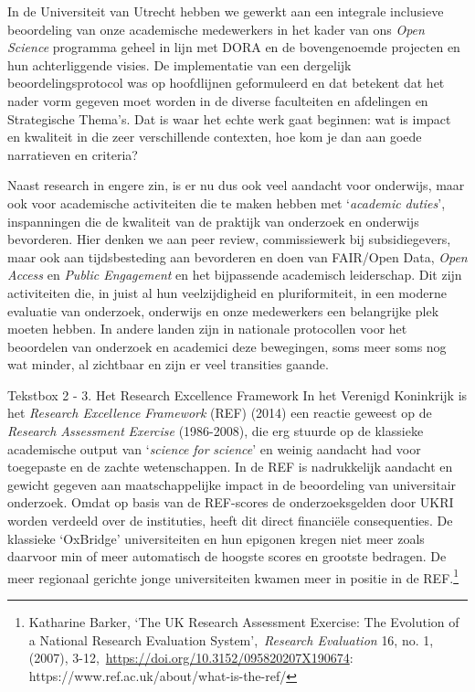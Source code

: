 \documentclass[smallauthor, chapterhaspagenum, nochapterinheader, pagenuminheader,  bigchapnum,medium2, tocpages,  garamond, titleinheader]{jote-book}
\begin{document}
	In de Universiteit van Utrecht hebben we gewerkt aan een integrale inclusieve beoordeling van onze academische medewerkers in het kader van ons \emph{Open }\emph{Science} programma geheel in lijn met DORA en de bovengenoemde projecten en hun achterliggende visies. De implementatie van een dergelijk beoordelingsprotocol was op hoofdlijnen geformuleerd en dat betekent dat het nader vorm gegeven moet worden in de diverse faculteiten en afdelingen en Strategische Thema's. Dat is waar het echte werk gaat beginnen: wat is impact en kwaliteit in die zeer verschillende contexten, hoe kom je dan aan goede narratieven en criteria?











	Naast research in engere zin, is er nu dus ook veel aandacht voor onderwijs, maar ook voor academische activiteiten die te maken hebben met ‘\emph{academic}\emph{ }\emph{duties}', inspanningen die de kwaliteit van de praktijk van onderzoek en onderwijs bevorderen. Hier denken we aan peer review, commissiewerk bij subsidiegevers, maar ook aan tijdsbesteding aan bevorderen en doen van FAIR/Open Data, \emph{Open Access} en \emph{Public Engagement} en het bijpassende academisch leiderschap. Dit zijn activiteiten die, in juist al hun veelzijdigheid en pluriformiteit, in een moderne evaluatie van onderzoek, onderwijs en onze medewerkers een belangrijke plek moeten hebben. In andere landen zijn in nationale protocollen voor het beoordelen van onderzoek en academici deze bewegingen, soms meer soms nog wat minder, al zichtbaar en zijn er veel transities gaande.

	\begin{bookbox}{Tekstbox 2 - 3. Het Research Excellence Framework}
		In het Verenigd Koninkrijk is het \emph{Research Excellence Framework} (REF) (2014) een reactie geweest op de \emph{Research Assessment }\emph{Exercise} (1986-2008), die erg stuurde op de klassieke academische output van ‘\emph{science}\emph{ }\emph{for}\emph{ }\emph{science}' en weinig aandacht had voor toegepaste en de zachte wetenschappen. In de REF is nadrukkelijk aandacht en gewicht gegeven aan maatschappelijke impact in de beoordeling van universitair onderzoek. Omdat op basis van de REF-scores de onderzoeksgelden door UKRI worden verdeeld over de instituties, heeft dit direct financiële consequenties. De klassieke ‘OxBridge' universiteiten en hun epigonen kregen niet meer zoals daarvoor min of meer automatisch de hoogste scores en grootste bedragen. De meer regionaal gerichte jonge universiteiten kwamen meer in positie in de REF.\footnote{Katharine Barker, ‘The UK Research Assessment Exercise: The Evolution of a National Research Evaluation System', \emph{Research Evaluation}\emph{ }16, no. 1, (2007), 3-12, \href{https://audiovisual.ec.europa.eu/en/video/I-216463?lg=EN}{https://doi.org/10.3152/095820207X190674}: https://www.ref.ac.uk/about/what-is-the-ref/}
	\end{bookbox}
\end{document}
